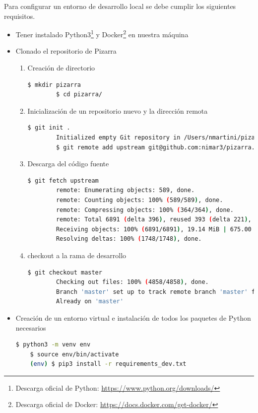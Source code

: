 \documentclass[11pt,spanish,listoffigures,listoftables]{tfgetsinf}
\begin{document}
Para configurar un entorno de desarrollo local se debe cumplir  los siguientes requisitos.

\begin{itemize}
	\item  Tener instalado Python3\footnote{Descarga oficial de Python: \url{https://www.python.org/downloads/}} y Docker\footnote{Descarga oficial de Docker: \url{https://docs.docker.com/get-docker/}} en nuestra máquina
	\item Clonado el repositorio de Pizarra
	\begin{enumerate}
		\item Creación de directorio
		\begin{lstlisting}[language=bash]
		$ mkdir pizarra
		$ cd pizarra/
		\end{lstlisting}
		\item Inicialización de un repositorio nuevo y la dirección remota
		\begin{lstlisting}[language=bash]
		$ git init .
		Initialized empty Git repository in /Users/nmartini/pizarra/.git/
		$ git remote add upstream git@github.com:nimar3/pizarra.git
		\end{lstlisting}
		\item Descarga del código fuente
		\begin{lstlisting}[language=bash]
		$ git fetch upstream
		remote: Enumerating objects: 589, done.
		remote: Counting objects: 100% (589/589), done.
		remote: Compressing objects: 100% (364/364), done.
		remote: Total 6891 (delta 396), reused 393 (delta 221), pack-reused 6302
		Receiving objects: 100% (6891/6891), 19.14 MiB | 675.00 KiB/s, done.
		Resolving deltas: 100% (1748/1748), done.
		\end{lstlisting}
		\item \foreignlanguage{english}{checkout} a la rama de desarrollo
		\begin{lstlisting}[language=bash]
		$ git checkout master
		Checking out files: 100% (4858/4858), done.
		Branch 'master' set up to track remote branch 'master' from 'upstream'.
		Already on 'master'
		\end{lstlisting}
	\end{enumerate}
	\item Creación de un entorno virtual e instalación de todos los \Gls{paquete}s de Python necesarios
	\begin{lstlisting}[language=bash]
	$ python3 -m venv env
	$ source env/bin/activate   
	(env) $ pip3 install -r requirements_dev.txt
	\end{lstlisting}
\end{itemize}
\end{document}
